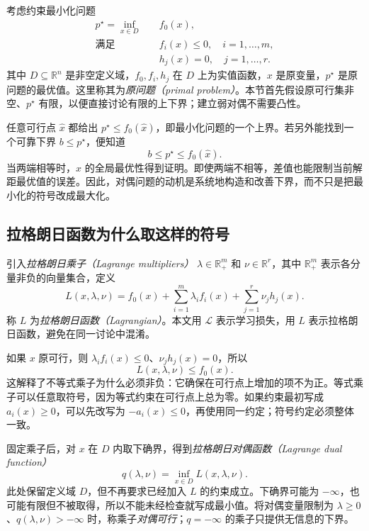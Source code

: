 \documentclass[UTF8,12pt,a4paper,fontset=fandol]{ctexart}
\begin{document}
考虑约束最小化问题
\begin{equation}
 \begin{aligned}
 p^\star=\inf_{x\in D}\quad & f_0(x),\\
 \text{满足}\quad & f_i(x)\leq0,\quad i=1,\ldots,m,\\
 &h_j(x)=0,\quad j=1,\ldots,r.
 \end{aligned}
 \label{eq:duality-primal}
\end{equation}
其中 $D\subseteq\mathbb R^n$ 是非空定义域，$f_0,f_i,h_j$ 在 $D$ 上为实值函数，$x$ 是原变量，$p^\star$ 是原问题的最优值。这里称其为\emph{原问题（primal problem）}。本节首先假设原可行集非空、$p^\star$ 有限，以便直接讨论有限的上下界；建立弱对偶不需要凸性。

任意可行点 $\widehat x$ 都给出 $p^\star\leq f_0(\widehat x)$，即最小化问题的一个上界。若另外能找到一个可靠下界 $b\leq p^\star$，便知道
\[
 b\leq p^\star\leq f_0(\widehat x).
\]
当两端相等时，$\widehat x$ 的全局最优性得到证明。即使两端不相等，差值也能限制当前解距最优值的误差。因此，对偶问题的动机是系统地构造和改善下界，而不只是把最小化的符号改成最大化。

\subsection{拉格朗日函数为什么取这样的符号}

引入\emph{拉格朗日乘子（Lagrange multipliers）} $\lambda\in\mathbb R_+^m$ 和 $\nu\in\mathbb R^r$，其中 $\mathbb R_+^m$ 表示各分量非负的向量集合，定义
\begin{equation}
 L(x,\lambda,\nu)
 =f_0(x)+\sum_{i=1}^m\lambda_i f_i(x)
       +\sum_{j=1}^r\nu_jh_j(x).
 \label{eq:duality-lagrangian}
\end{equation}
称 $L$ 为\emph{拉格朗日函数（Lagrangian）}。本文用 $\mathcal L$ 表示学习损失，用 $L$ 表示拉格朗日函数，避免在同一讨论中混淆。

如果 $x$ 原可行，则 $\lambda_i f_i(x)\leq0$、$\nu_jh_j(x)=0$，所以
\begin{equation}
 L(x,\lambda,\nu)\leq f_0(x).
 \label{eq:duality-feasible-lagrangian}
\end{equation}
这解释了不等式乘子为什么必须非负：它确保在可行点上增加的项不为正。等式乘子可以任意取符号，因为等式约束在可行点上总为零。如果约束最初写成 $a_i(x)\geq0$，可以先改写为 $-a_i(x)\leq0$，再使用同一约定；符号约定必须整体一致。

固定乘子后，对 $x$ 在 $D$ 内取下确界，得到\emph{拉格朗日对偶函数（Lagrange dual function）}
\begin{equation}
 q(\lambda,\nu)=\inf_{x\in D}L(x,\lambda,\nu).
 \label{eq:duality-function}
\end{equation}
此处保留定义域 $D$，但不再要求已经加入 $L$ 的约束成立。下确界可能为 $-\infty$，也可能有限但不被取得，所以不能未经检查就写成最小值。将对偶变量限制为 $\lambda\geq0$、$q(\lambda,\nu)>-\infty$ 时，称乘子\emph{对偶可行}；$q=-\infty$ 的乘子只提供无信息的下界。
\end{document}
